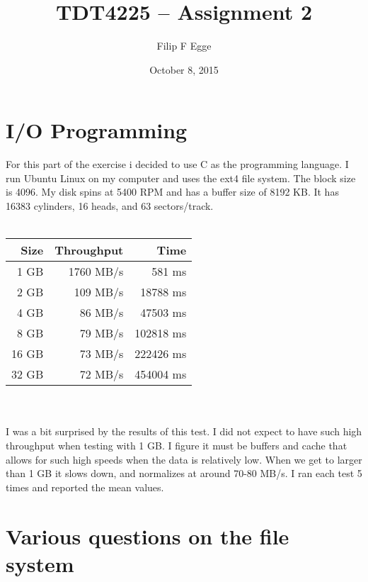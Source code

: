 \documentclass{article}
\begin{document}
\title{TDT4225 -- Assignment 2}
\author{Filip F Egge}
\date{October 8, 2015}
\maketitle

\newpage
\section{I/O Programming}
	For this part of the exercise i decided to use C as the programming language.
	I run Ubuntu Linux on my computer and uses the ext4 file system. The block size is 4096. My disk spins at 5400 RPM and has a buffer size of 8192 KB. It has 16383 cylinders, 16 heads, and 63 sectors/track.
	\\
	\\
	\begin{tabular}{r | r | r}
		\textbf{Size} & \textbf{Throughput} & \textbf{Time} \\
		\hline
		1 GB & 1760 MB/s & 581 ms \\
		2 GB & 109 MB/s & 18788 ms \\
		4 GB & 86 MB/s & 47503 ms \\
		8 GB & 79 MB/s & 102818 ms \\
		16 GB & 73 MB/s & 222426 ms \\
		32 GB & 72 MB/s & 454004 ms\\
	\end{tabular}
	\\
	\\
	I was a bit surprised by the results of this test. I did not expect to have such high throughput when testing with 1 GB. I figure it must be buffers and cache that allows for such high speeds when the data is relatively low. When we get to larger than 1 GB it slows down, and normalizes at around 70-80 MB/s. I ran each test 5 times and reported the mean values.
\section{Various questions on the file system}
\end{document}
